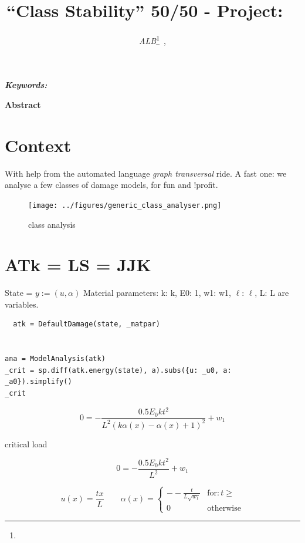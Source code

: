 \documentclass[]{article}
\title{
\vspace{-2em}
\textbf{``Class Stability'' 50/50} - 
Project: \textbf{\proj}~  }
\author{  
\emph{ALB}\footnote{}~,
}
\date{\vspace{-5em}}
\begin{document}
\ifpdf
{}
\else
{}
\fi

\maketitle


\begin{center}
\Large{}






\end{center}

\noindent\emph{\textbf{Keywords:} 
}

\medskip

\textbf{Abstract}
\section{Context}
With help from the automated language \emph{graph transversal} ride. A fast one:
we analyse a few classes of damage models, for fun and !profit.



\begin{figure}[htbp]
  \centering
  \texttt{[image: ../figures/generic\_class\_analyser.png]}
  \caption{class analysis}
  \label{fig:class-analyser}
\end{figure}

\section*{ATk = LS = JJK}
\newcommand{\ilen}{\ell}
State = $y:=(u, \alpha)$
Material parameters:
{k: k, E0: 1, w1: w1, $\ilen$: $\ilen$, L: L} are variables.


\begin{verbatim}
  atk = DefaultDamage(state, _matpar)


ana = ModelAnalysis(atk)
_crit = sp.diff(atk.energy(state), a).subs({u: _u0, a: _a0}).simplify()
_crit
\end{verbatim}


$$
0=- \frac{0.5 E_{0} k t^{2}}{L^{2} \left(k \alpha{\left(x \right)} - \alpha{\left(x \right)} + 1\right)^{2}} + w_{1}
$$

critical load

$$
0=- \frac{0.5 E_{0} k t^{2}}{L^{2}} + w_{1}
$$

\begin{equation}
  \label{eqn:mod-crit}
    u{\left(x \right)} = \frac{t x}{L} \qquad
  \alpha{\left(x \right)} = 
  \begin{cases} 
      -- \frac{t}{L \sqrt{w_{1}}} & \text{for}: t \geq \\ 
      0 & \text{otherwise}
  \end{cases}
\end{equation}
\end{document}
